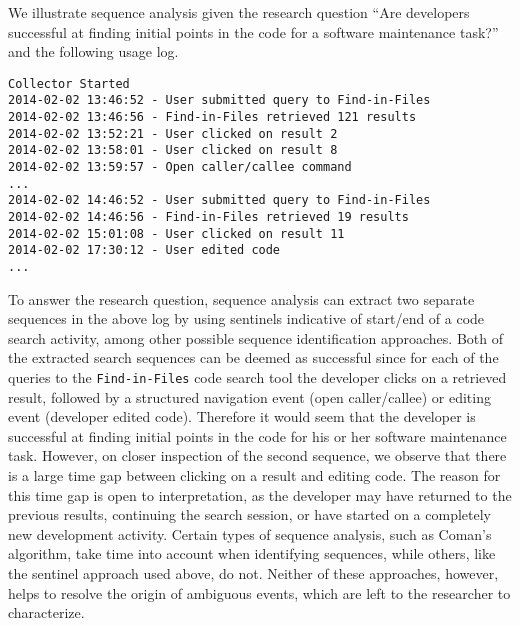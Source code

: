 We illustrate sequence analysis given the research question  ``Are developers successful at finding initial points in the code for a software maintenance task?'' and the following usage log.

\begin{verbatim}
Collector Started
2014-02-02 13:46:52 - User submitted query to Find-in-Files
2014-02-02 13:46:56 - Find-in-Files retrieved 121 results
2014-02-02 13:52:21 - User clicked on result 2
2014-02-02 13:58:01 - User clicked on result 8
2014-02-02 13:59:57 - Open caller/callee command 
...
2014-02-02 14:46:52 - User submitted query to Find-in-Files
2014-02-02 14:46:56 - Find-in-Files retrieved 19 results
2014-02-02 15:01:08 - User clicked on result 11
2014-02-02 17:30:12 - User edited code
...
\end{verbatim}

To answer the research question, sequence analysis can extract two separate sequences in the above log by using sentinels indicative of start/end of a code search activity, among other possible sequence identification approaches. Both of the extracted search sequences can be deemed as successful since for each of the queries to the {\tt Find-in-Files} code search tool the developer clicks on a retrieved result, followed by a structured navigation event (open caller/callee) or editing event (developer edited code). Therefore it would seem that the developer is successful at finding initial points in the code for his or her software maintenance task. However, on closer inspection of the second sequence, we observe that there is a large time gap between clicking on a result and editing code. The reason for this time gap is open to interpretation, as the developer may have returned to the previous results, continuing the search session, or have started on a completely new development activity. Certain types of sequence analysis, such as Coman's algorithm, take time into account when identifying sequences, while others, like the sentinel approach used above, do not. Neither of these approaches, however, helps to resolve the origin of ambiguous events, which are left to the researcher to characterize.




